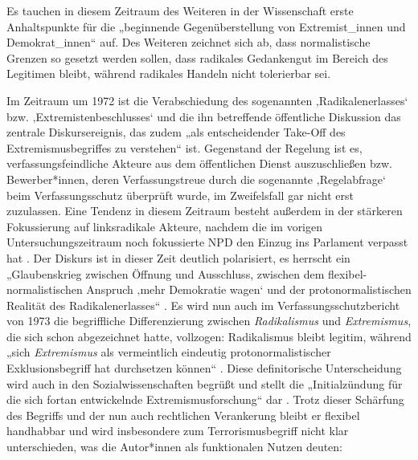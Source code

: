 Es tauchen in diesem Zeitraum des Weiteren in der Wissenschaft erste Anhaltspunkte für die „beginnende Gegenüberstellung von Extremist\_innen und Demokrat\_innen`` \autocite[122]{ackermannMetamorphosenExtremismusbegriffesDiskursanalytische2015} auf. Des Weiteren zeichnet sich ab, dass normalistische Grenzen so gesetzt werden sollen, dass radikales Gedankengut im Bereich des Legitimen bleibt, während radikales Handeln nicht tolerierbar sei.

Im Zeitraum um 1972 ist die Verabschiedung des sogenannten ‚Radikalenerlasses` bzw. ‚Extremistenbeschlusses` und die ihn betreffende öffentliche Diskussion das zentrale Diskursereignis, das zudem „als entscheidender Take-Off des Extremismusbegriffes zu verstehen`` \autocite[122]{ackermannMetamorphosenExtremismusbegriffesDiskursanalytische2015} ist. Gegenstand der Regelung ist es, verfassungsfeindliche Akteure aus dem öffentlichen Dienst auszuschließen bzw. Bewerber*innen, deren Verfassungstreue durch die sogenannte ‚Regelabfrage` beim Verfassungsschutz überprüft wurde, im Zweifelsfall gar nicht erst zuzulassen. Eine Tendenz in diesem Zeitraum besteht außerdem in der stärkeren Fokussierung auf linksradikale Akteure, nachdem die im vorigen Untersuchungszeitraum noch fokussierte NPD den Einzug ins Parlament verpasst hat \autocite[122]{ackermannMetamorphosenExtremismusbegriffesDiskursanalytische2015}. Der Diskurs ist in dieser Zeit deutlich polarisiert, es herrscht ein „Glaubenskrieg zwischen Öffnung und Ausschluss, zwischen dem flexibel-normalistischen Anspruch ‚mehr Demokratie wagen` und der protonormalistischen Realität des Radikalenerlasses`` \autocite[143]{ackermannMetamorphosenExtremismusbegriffesDiskursanalytische2015}. Es wird nun auch im Verfassungsschutzbericht von 1973 die begriffliche Differenzierung zwischen \emph{Radikalismus} und \emph{Extremismus}, die sich schon abgezeichnet hatte, vollzogen: Radikalismus bleibt legitim, während „sich \emph{Extremismus} als vermeintlich eindeutig protonormalistischer Exklusionsbegriff hat durchsetzen können`` \autocite[144]{ackermannMetamorphosenExtremismusbegriffesDiskursanalytische2015}. Diese definitorische Unterscheidung wird auch in den Sozialwissenschaften begrüßt und stellt die „Initialzündung für die sich fortan entwickelnde Extremismusforschung`` dar \autocite[144]{ackermannMetamorphosenExtremismusbegriffesDiskursanalytische2015}. Trotz dieser Schärfung des Begriffs und der nun auch rechtlichen Verankerung bleibt er flexibel handhabbar und wird insbesondere zum Terrorismusbegriff nicht klar unterschieden, was die Autor*innen als funktionalen Nutzen deuten:

